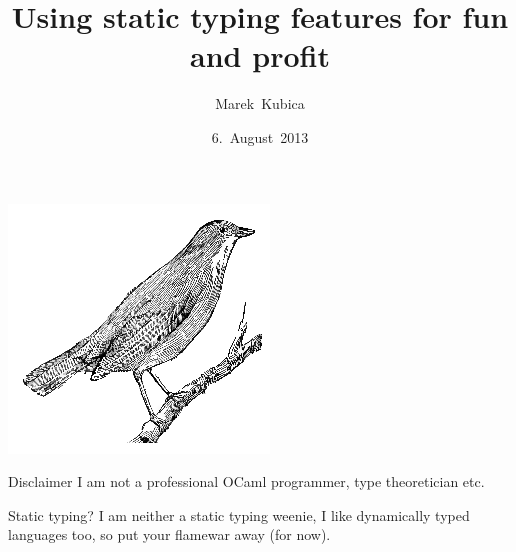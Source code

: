 \documentclass{beamer}
\title{Using static typing features for fun and profit}
\author{Marek~Kubica}
\date{6.~August~2013}
\institute{Lambda Munich}
\begin{document}
{
  \usebackgroundtemplate%
  {%
    \includegraphics[width=\paperwidth,height=\paperheight]{nightingdale}%
  }
  \frame{\titlepage}
}

\begin{frame}
  \begin{alertblock}{Disclaimer}
    I am not a professional OCaml programmer, type theoretician etc.
  \end{alertblock}
  \pause
  \begin{alertblock}{Static typing?}
    I am neither a static typing weenie, I like dynamically typed languages
    too, so put your flamewar away (for now).
  \end{alertblock}
\end{frame}
\end{document}
